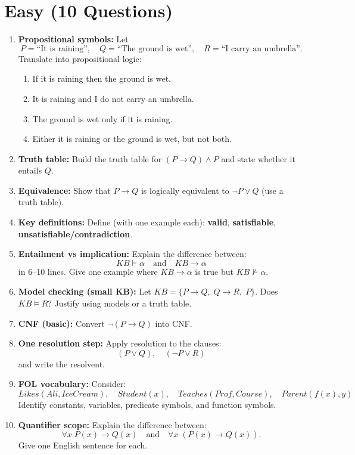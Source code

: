 \documentclass[11pt,a4paper]{article}
\begin{document}
\section*{Easy (10 Questions)}
\begin{enumerate}[label=E\arabic*., leftmargin=*]
  \item \textbf{Propositional symbols:} Let
    \[
      P=\text{``It is raining''},\quad Q=\text{``The ground is wet''},\quad R=\text{``I carry an umbrella''}.
    \]
    Translate into propositional logic:
    \begin{enumerate}[label=(\alph*), leftmargin=*]
      \item If it is raining then the ground is wet.
      \item It is raining and I do not carry an umbrella.
      \item The ground is wet only if it is raining.
      \item Either it is raining or the ground is wet, but not both.
    \end{enumerate}

  \item \textbf{Truth table:} Build the truth table for $(P \rightarrow Q) \land P$ and state whether it entails $Q$.

  \item \textbf{Equivalence:} Show that $P \rightarrow Q$ is logically equivalent to $\lnot P \lor Q$ (use a truth table).

  \item \textbf{Key definitions:} Define (with one example each):
    \textbf{valid}, \textbf{satisfiable}, \textbf{unsatisfiable/contradiction}.

  \item \textbf{Entailment vs implication:} Explain the difference between:
    \[
      KB \models \alpha \quad \text{and} \quad KB \rightarrow \alpha
    \]
    in 6--10 lines. Give one example where $KB \rightarrow \alpha$ is true but $KB \not\models \alpha$.

  \item \textbf{Model checking (small KB):} Let $KB=\{P \rightarrow Q,\; Q \rightarrow R,\; P\}$.
    Does $KB \models R$? Justify using models or a truth table.

  \item \textbf{CNF (basic):} Convert $\lnot(P \rightarrow Q)$ into CNF.

  \item \textbf{One resolution step:} Apply resolution to the clauses:
    \[
      (P \lor Q), \quad (\lnot P \lor R)
    \]
    and write the resolvent.

  \item \textbf{FOL vocabulary:} Consider:
    \[
      Likes(Ali, IceCream),\quad Student(x),\quad Teaches(Prof, Course),\quad Parent(f(x), y)
    \]
    Identify constants, variables, predicate symbols, and function symbols.

  \item \textbf{Quantifier scope:} Explain the difference between:
    \[
      \forall x\; P(x) \rightarrow Q(x) \quad \text{and} \quad \forall x\; (P(x) \rightarrow Q(x)).
    \]
    Give one English sentence for each.
\end{enumerate}
\end{document}
